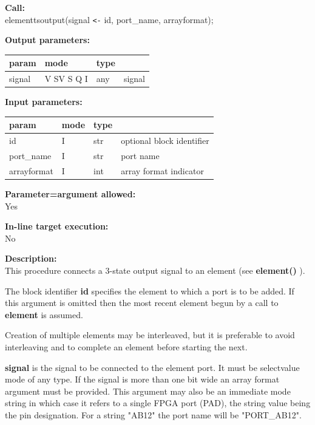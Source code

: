         {\bf Call:} \\
        elementtsoutput(signal \verb'<-' id, port\_name, arrayformat);
        
        {\bf Output parameters:} \\
        \begin{tabular}{| l | l | l | l |}
        \hline
        param  & mode     & type  & \\
        \hline \hline
        signal      & V SV S Q I & any & signal                    \\ \hline
        \end{tabular}
        
        {\bf Input parameters:} \\
        \begin{tabular}{| l | l | l | l |}
        \hline
        param  & mode     & type  & \\
        \hline \hline
        id          & I          & str & optional block identifier \\ \hline
        port\_name  & I          & str & port name                 \\ \hline
        arrayformat & I          & int & array format indicator    \\ \hline
        \end{tabular}
        
        {\bf Parameter=argument allowed:} \\
        Yes
        
        {\bf In-line target execution:} \\
        No
        
        {\bf Description:} \\
        This procedure connects a 3-state output signal to an element (see {\bf element()}
        ).
        
        The block identifier {\bf id} specifies the element to which a port is to
        be added. If this argument is omitted then the most recent
        element begun by a call to {\bf element} is assumed.
        
        Creation of multiple elements may be interleaved, but it is preferable to
        avoid interleaving and to complete an element before starting the next.
        
        {\bf signal} is the signal to be connected to the element port. It must be
        selectvalue mode of any type. If the signal is more than one bit wide an
        array format argument must be provided. This argument may also be an
        immediate mode string in which case it refers to a single FPGA port (PAD),
        the string value being the pin designation. For a string "AB12" the port name
        will be "PORT\_AB12".
        

